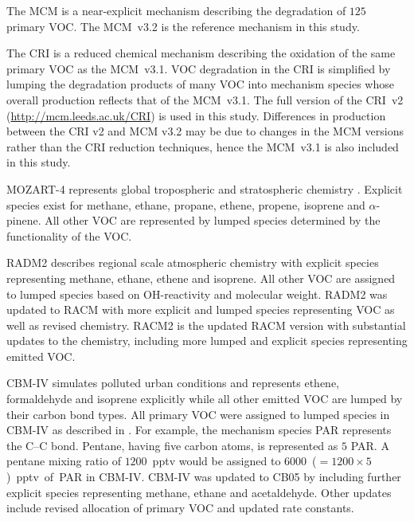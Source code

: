 The MCM \citep{Jenkin:1997, Jenkin:2003, Saunders:2003, Bloss:2005, MCM_Site} is a near-explicit mechanism describing the degradation of $125$ primary VOC. 
The \mbox{MCM v3.2} is the reference mechanism in this study.

The CRI \citep{Jenkin:2008} is a reduced chemical mechanism describing the oxidation of the same primary VOC as the \mbox{MCM v3.1}. 
VOC degradation in the CRI is simplified by lumping the degradation products of many VOC into mechanism species whose overall  production reflects that of the \mbox{MCM v3.1}. 
The full version of the \mbox{CRI v2} (\url{http://mcm.leeds.ac.uk/CRI}) is used in this study.
Differences in  production between the CRI v2 and MCM v3.2 may be due to changes in the MCM versions rather than the CRI reduction techniques, hence the \mbox{MCM v3.1} is also included in this study.

MOZART-4 represents global tropospheric and stratospheric chemistry \citep{Emmons:2010}. 
Explicit species exist for methane, ethane, propane, ethene, propene, isoprene and $\alpha$-pinene.
All other VOC are represented by lumped species determined by the functionality of the VOC.

RADM2 \citep{Stockwell:1990} describes regional scale atmospheric chemistry with explicit species representing methane, ethane, ethene and isoprene. 
All other VOC are assigned to lumped species based on OH-reactivity and molecular weight.
RADM2 was updated to RACM \citep{Stockwell:1997} with more explicit and lumped species representing VOC as well as revised chemistry.
RACM2 is the updated RACM version \citep{Goliff:2013} with substantial updates to the chemistry, including more lumped and explicit species representing emitted VOC.

CBM-IV \citep{Gery:1989} simulates polluted urban conditions and represents ethene, formaldehyde and isoprene explicitly while all other emitted VOC are lumped by their carbon bond types. 
All primary VOC were assigned to lumped species in CBM-IV as described in \citet{Hogo:1989}. 
For example, the mechanism species PAR represents the C--C bond.
Pentane, having five carbon atoms, is represented as $5$ PAR.
A pentane mixing ratio of \mbox{$1200$ pptv} would be assigned to \mbox{$6000$ ($= 1200 \times 5$) pptv of PAR} in CBM-IV.
CBM-IV was updated to CB05 \citep{Yarwood:2005} by including further explicit species representing methane, ethane and acetaldehyde. 
Other updates include revised allocation of primary VOC and updated rate constants.
%
